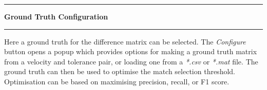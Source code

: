 \noindent\rule{\textwidth}{1pt}
\indent \textbf{Ground Truth Configuration}
\noindent\rule{\textwidth}{1pt}
\smallskip
\parbox{\textwidth}{Here a ground truth for the difference matrix can be selected. The \textit{Configure} button opens a popup which provides options for making a ground truth matrix from a velocity and tolerance pair, or loading one from a \textit{*.csv} or \textit{*.mat} file. The ground truth can then be used to optimise the match selection threshold. Optimisation can be based on maximising precision, recall, or F1 score.}
\smallskip
